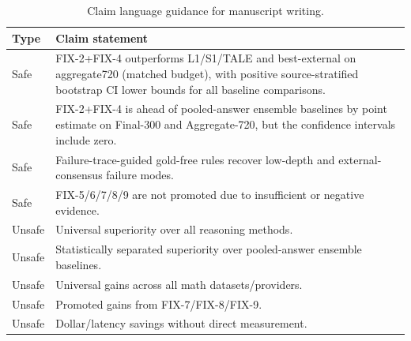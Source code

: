 \begin{table}[H]
\centering
\caption{Claim language guidance for manuscript writing.}
\label{tab:claim_language}
\small
\begin{tabular}{lp{}}
\toprule
Type & Claim statement \\
\midrule
Safe & FIX-2+FIX-4 outperforms L1/S1/TALE and best-external on aggregate720 (matched budget), with positive source-stratified bootstrap CI lower bounds for all baseline comparisons. \\
Safe & FIX-2+FIX-4 is ahead of pooled-answer ensemble baselines by point estimate on Final-300 and Aggregate-720, but the confidence intervals include zero. \\
Safe & Failure-trace-guided gold-free rules recover low-depth and external-consensus failure modes. \\
Safe & FIX-5/6/7/8/9 are not promoted due to insufficient or negative evidence. \\
Unsafe & Universal superiority over all reasoning methods. \\
Unsafe & Statistically separated superiority over pooled-answer ensemble baselines. \\
Unsafe & Universal gains across all math datasets/providers. \\
Unsafe & Promoted gains from FIX-7/FIX-8/FIX-9. \\
Unsafe & Dollar/latency savings without direct measurement. \\
\bottomrule
\end{tabular}
\end{table}
